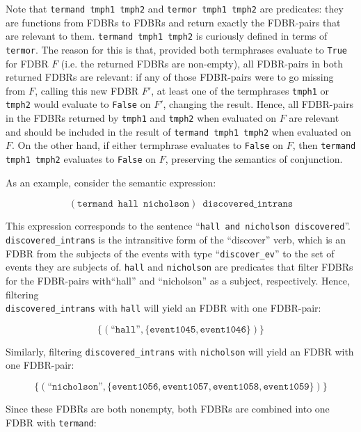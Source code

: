 \documentclass[../main.tex]{subfiles}
\begin{document}
Note that \texttt{termand tmph1 tmph2} and \texttt{termor tmph1 tmph2} are predicates: they are functions from FDBRs to FDBRs and return exactly the FDBR-pairs
that are relevant to them.  \texttt{termand tmph1 tmph2} is curiously defined in terms of \texttt{termor}.  The reason for this is that, provided both termphrases
evaluate to \texttt{True} for FDBR $F$ (i.e. the returned FDBRs are non-empty), all FDBR-pairs in both returned FDBRs are relevant: if any of those FDBR-pairs were to go missing from $F$, calling this new FDBR $F'$, at least one of the termphrases \texttt{tmph1} or \texttt{tmph2} would evaluate to \texttt{False} on $F'$, changing the result.  Hence, all FDBR-pairs in the FDBRs returned by \texttt{tmph1} and \texttt{tmph2} when evaluated on $F$ are relevant and should be included in the result of \texttt{termand tmph1 tmph2} when evaluated on $F$.  On the other hand, if either termphrase evaluates to \texttt{False} on $F$, then \texttt{termand tmph1 tmph2} evaluates to \texttt{False} on $F$, preserving the semantics of conjunction.

As an example, consider the semantic expression:

\[ (\mathtt{termand}\enspace\mathtt{hall}\enspace\mathtt{nicholson})\enspace\mathtt{discovered\_intrans} \]
 
This expression corresponds to the sentence ``\texttt{hall and nicholson discovered}''. \\
\texttt{discovered\_intrans} is the intransitive form of the ``discover'' verb, which is an FDBR from the subjects of the events with type ``\texttt{discover\_ev}'' to the set of events they are subjects of.  \texttt{hall} and \texttt{nicholson} are predicates that filter FDBRs for the FDBR-pairs with``hall'' and ``nicholson'' as a subject, respectively. Hence, filtering \\ \texttt{discovered\_intrans} with \texttt{hall} will yield an FDBR with one FDBR-pair:

\[ \{(\text{``}\mathtt{hall}\text{''}, \{ \mathtt{event1045}, \mathtt{event1046} \})\} \]

Similarly, filtering \texttt{discovered\_intrans} with \texttt{nicholson} will yield an FDBR with one FDBR-pair:

\[ \{(\text{``}\mathtt{nicholson}\text{''}, \{ \mathtt{event1056}, \mathtt{event1057}, \mathtt{event1058}, \mathtt{event1059} \})\} \]

Since these FDBRs are both nonempty, both FDBRs are combined into one FDBR with \texttt{termand}:
\end{document}
